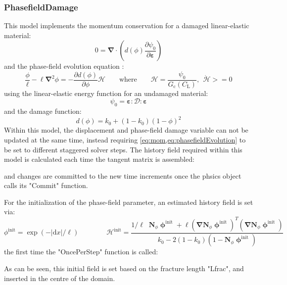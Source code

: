\documentclass[3p]{elsarticle} %
\begin{document}
\subsubsection{PhasefieldDamage}
This model implements the momentum conservation for a damaged linear-elastic material:
\begin{equation}
    0 = \bm{\nabla}  \cdot \left(d(\phi) \frac{\partial \psi_\mathrm{0}}{\partial \bm{\varepsilon}}\right)  \label{eq:mom}
\end{equation}
and the phase-field evolution equation \citep{Miehe2010,Miehe2010a,Borden2012,Wu2016}:
\begin{equation}
    \frac{\phi}{\ell} - \ell \bm{\nabla}^2\phi = - \frac{\partial d(\phi)}{\partial \phi} \mathcal{H} \qquad \mathrm{where} \qquad \mathcal{H} = \frac{\psi_\mathrm{0}}{G_\mathrm{c}(C_\mathrm{L})}, \; \, \dot{\mathcal{H}}>=0
    \label{eq:phasefieldEvolution}
\end{equation}
using the linear-elastic energy function for an undamaged material:
\begin{equation}
\psi_0 = \mathbf{\varepsilon}:\mathcal{D}:\mathbf{\varepsilon}
\end{equation}
and the damage function:
\begin{equation}
    d(\phi) = k_\mathrm{0} + (1-k_\mathrm{0}) (1-\phi)^2 \label{eq:degradeFunction}
\end{equation}
Within this model, the displacement and phase-field damage variable can not be updated at the same time, instead requiring \cref{eq:mom,eq:phasefieldEvolution} to be set to different staggered solver steps. The history field required within this model is calculated each time the tangent matrix is assembled:

and changes are committed to the new time increments once the phsics object calls its "Commit" function.

For the initialization of the phase-field parameter, an estimated history field is set via:
\begin{equation}
    \phi^{\mathrm{init}} = \exp\left(-\left|\text{d}x\right|/\ell\right) 
    \qquad \qquad 
    \mathcal{H}^{\mathrm{init}} = \frac{1/\ell \; \; \mathbf{N}_\phi \bm{\upphi}^{\mathrm{init}} + \ell \left(\bm{\nabla}\mathbf{N}_\phi \bm{\upphi}^{\mathrm{init}}\right)^T\left(\bm{\nabla}\mathbf{N}_\phi \bm{\upphi}^{\mathrm{init}}\right)}{k_\mathrm{0}-2(1-k_{\mathrm{0}})\left(1-\mathbf{N}_{\phi}\bm{\upphi}^{\mathrm{init}}\right)} \label{eq:initialization}
\end{equation}
the first time the "OncePerStep" function is called:

As can be seen, this initial field is set based on the fracture length "Lfrac", and inserted in the centre of the domain. 
\end{document}
